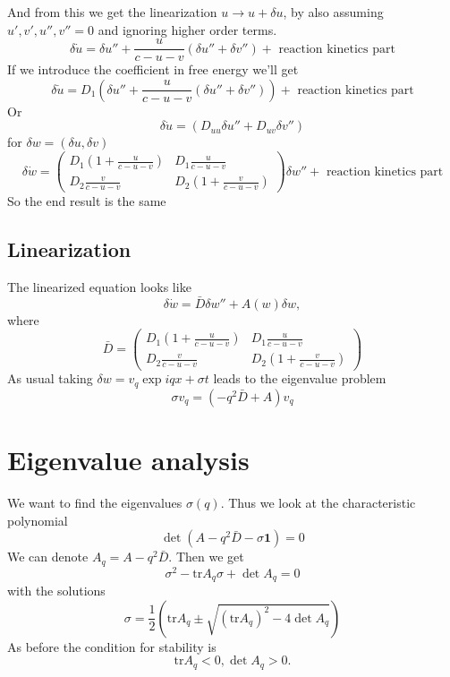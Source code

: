 \documentclass{article}
\newcommand{\tr}{\text{tr}}
\begin{document}
And from this we get the linearization $u \to u+\delta u$, by also assuming  $u',v',u'',v'' = 0$
and ignoring higher order terms.
$$\delta \dot u = \delta u'' + \frac{u}{c-u-v}(\delta u'' + \delta v'') + \text{ reaction kinetics part}$$
If we introduce the coefficient in free energy we'll get
$$\delta \dot u = D_1\left(\delta u'' + \frac{u}{c-u-v}(\delta u'' + \delta v'')\right) + \text{ reaction kinetics part}$$
Or
$$\delta \dot u = \left(D_{uu}\delta u'' + D_{uv}\delta v'' \right)$$
for $\delta  w=(\delta u, \delta v)$
$$\delta \dot w = \begin{pmatrix} D_1(1+\frac{u}{c-u-v}) & D_1\frac{u}{c-u-v}\\ D_2\frac{v}{c-u-v} & D_2(1+\frac{v}{c-u-v})\end{pmatrix} \delta w'' + \text{ reaction kinetics part}$$
So the end result is the same
		
\subsection{Linearization}
The linearized equation looks like
\begin{equation}
\delta \dot w = \bar{D} \delta w'' + A(w) \delta w,
\end{equation}
where 
\begin{equation}
\bar{D} = \begin{pmatrix} D_1(1+\frac{u}{c-u-v}) & D_1\frac{u}{c-u-v}\\ D_2\frac{v}{c-u-v} & D_2(1+\frac{v}{c-u-v})\end{pmatrix} 
\end{equation}
As usual taking $\delta w = v_q \exp{iqx+\sigma t}$ leads to the eigenvalue problem
\begin{equation}
\sigma v_q = (-q^2 \bar{D}+A)v_q
\end{equation}

\section{Eigenvalue analysis}
We want to find the eigenvalues $\sigma(q)$. Thus we look at the characteristic polynomial
\begin{equation}
\det(A-q^2\bar{D}-\sigma\mathbf{1}) = 0
\end{equation}
We can denote $A_q = A-q^2 \bar{D}$.
Then we get
\begin{equation}
\sigma^2 - \text{tr}A_q \sigma + \det A_q = 0
\end{equation}
with the solutions
\begin{equation}
\sigma=\frac12\left(\text{tr}A_q \pm \sqrt{(\text{tr}A_q)^2-4\det A_q}\right)
\end{equation}
As before the condition for stability is
\[\tr A_q < 0, \det A_q > 0.\]
\end{document}
